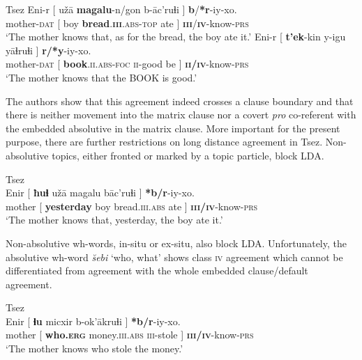 \documentclass[output=paper
,modfonts
,nonflat]{langsci/langscibook}
\begin{document}
\begin{exe}
	\ex Tsez \citep[][610-611]{Polinsky_Potsdam2001}
	\xlist
	\ex \label{ex:tsez_overt_top}
		\gll Eni-r [ u\v{z}\=a \textbf{magalu}-n/gon b-\=ac’ruɬi ] \textbf{b}/\textbf{*r}-iy-xo.\\
			mother-\textsc{dat} [ boy \textbf{bread}.\textsc{\textbf{iii}.abs-top} ate ] \textsc{\textbf{iii}}/\textsc{\textbf{iv}}-know-\textsc{prs}\\
		\glt `The mother knows that, as for the bread, the boy ate it.' 
	\ex \label{ex:tsez_overt_foc}
		\gll Eni-r [ \textbf{t'ek}-kin y-igu y\=aɬruɬi ] \textbf{r/*y}-iy-xo.\\
			 mother-\textsc{dat} [ \textbf{book}.\textsc{ii.abs-foc}  \textsc{ii}-good be ] \textbf{\textsc{ii/iv}}-know-\textsc{prs}\\
	    \glt `The mother knows that the BOOK is good.'
	\endxlist
\end{exe}
The authors show that this agreement indeed crosses a clause boundary and that there is neither movement into the matrix clause nor a covert \textit{pro} co-referent with the embedded absolutive in the matrix clause. More important for the present purpose, there are further restrictions on long distance agreement in Tsez. Non-absolutive topics, either fronted or marked by a topic particle, block LDA.
\begin{exe}
	\ex Tsez \citep[][636]{Polinsky_Potsdam2001} \label{ex:tsez_nonabs_top}\\
		\gll Enir [ \textbf{ħuɬ} u\v{z}\=a magalu b\=ac’ruɬi ] \textbf{*b/r}-iy-xo.\\
		mother [ \textbf{yesterday} boy bread.\textsc{iii.abs} ate ] \textsc{\textbf{iii/iv}}-know-\textsc{prs}\\
		\glt `The mother knows that, yesterday, the boy ate it.'
\end{exe}
Non-absolutive wh-words, in-situ or ex-situ, also block LDA. Unfortunately, the absolutive wh-word \textit{\u{s}ebi} `who, what' shows class \textsc{iv} agreement which cannot be differentiated from agreement with the whole embedded clause/default agreement.
\begin{exe}
	\ex Tsez \citep[][634]{Polinsky_Potsdam2001} \label{ex:tsez_wh}\\
		\gll Enir [ \textbf{ɬu} micxir b-ok'\=akruɬi ] \textbf{*b/r}-iy-xo.\\
		 mother [ \textbf{who.\textsc{erg}} money.\textsc{iii.abs} \textsc{iii}-stole ]	\textsc{\textbf{iii/iv}}-know-\textsc{prs}\\
		\glt `The mother knows who stole the money.'
\end{exe}
\end{document}
